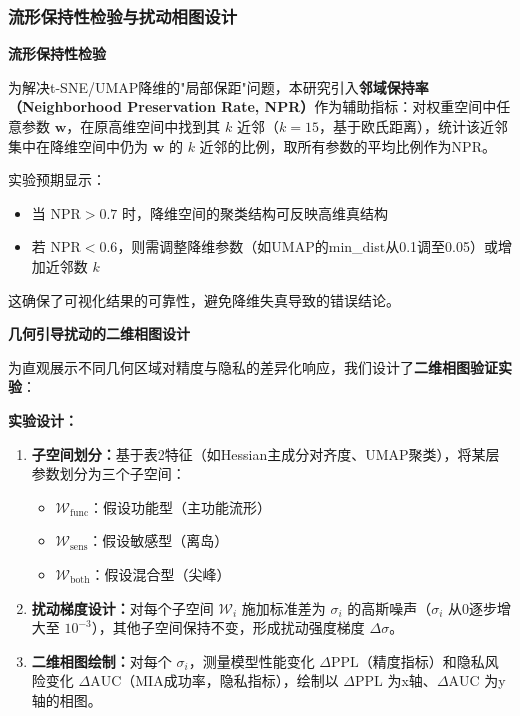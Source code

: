 \documentclass[letterpaper,twocolumn,10pt]{article}
\begin{document}
\subsubsection{流形保持性检验与扰动相图设计}

\textbf{流形保持性检验}

为解决t-SNE/UMAP降维的"局部保距"问题，本研究引入\textbf{邻域保持率（Neighborhood Preservation Rate, NPR）}作为辅助指标：对权重空间中任意参数 $\mathbf{w}$，在原高维空间中找到其 $k$ 近邻（$k=15$，基于欧氏距离），统计该近邻集中在降维空间中仍为 $\mathbf{w}$ 的 $k$ 近邻的比例，取所有参数的平均比例作为NPR。

实验预期显示：
\begin{itemize}
\item 当 $\text{NPR} > 0.7$ 时，降维空间的聚类结构可反映高维真结构
\item 若 $\text{NPR} < 0.6$，则需调整降维参数（如UMAP的min\_dist从0.1调至0.05）或增加近邻数 $k$
\end{itemize}

这确保了可视化结果的可靠性，避免降维失真导致的错误结论。

\textbf{几何引导扰动的二维相图设计}

为直观展示不同几何区域对精度与隐私的差异化响应，我们设计了\textbf{二维相图验证实验}：

\textbf{实验设计：}

\begin{enumerate}
\item \textbf{子空间划分：}基于表2特征（如Hessian主成分对齐度、UMAP聚类），将某层参数划分为三个子空间：
\begin{itemize}
\item $\mathcal{W}_{\text{func}}$：假设功能型（主功能流形）
\item $\mathcal{W}_{\text{sens}}$：假设敏感型（离岛）
\item $\mathcal{W}_{\text{both}}$：假设混合型（尖峰）
\end{itemize}

\item \textbf{扰动梯度设计：}对每个子空间 $\mathcal{W}_i$ 施加标准差为 $\sigma_i$ 的高斯噪声（$\sigma_i$ 从0逐步增大至 $10^{-3}$），其他子空间保持不变，形成扰动强度梯度 $\Delta\sigma$。

\item \textbf{二维相图绘制：}对每个 $\sigma_i$，测量模型性能变化 $\Delta\text{PPL}$（精度指标）和隐私风险变化 $\Delta\text{AUC}$（MIA成功率，隐私指标），绘制以 $\Delta\text{PPL}$ 为x轴、$\Delta\text{AUC}$ 为y轴的相图。
\end{enumerate}
\end{document}
